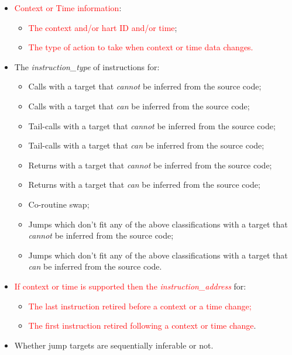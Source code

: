 \begin{itemize}
  \item \textcolor{red}{Context or Time information}:
    \begin{itemize}
      \item \textcolor{red}{The context and/or hart ID and/or time};
      \item \textcolor{red}{The type of action to take when context or time data changes.}
    \end{itemize}
  \item The \textit{instruction\_type} of instructions for:
    \begin{itemize}
      \item Calls with a target that \textit{cannot} be inferred from the source code;
      \item Calls with a target that \textit{can} be inferred from the source code;
      \item Tail-calls with a target that \textit{cannot} be inferred from the source code;
      \item Tail-calls with a target that \textit{can} be inferred from the source code;
      \item Returns with a target that \textit{cannot} be inferred from the source code;
      \item Returns with a target that \textit{can} be inferred from the source code;
      \item Co-routine swap;
      \item Jumps which don't fit any of the above classifications with a target that \textit{cannot} be inferred from the source code;
      \item Jumps which don't fit any of the above classifications with a target that \textit{can} be inferred from the source code.
    \end{itemize}
  \item \textcolor{red}{If context or time is supported then the \textit{instruction\_address}} for:
    \begin{itemize}
      \item \textcolor{red}{The last instruction retired before a context or a time change;}
      \item \textcolor{red}{The first instruction retired following a context or time change}.
    \end{itemize}
  \item Whether jump targets are sequentially inferable or not.
\end{itemize}

